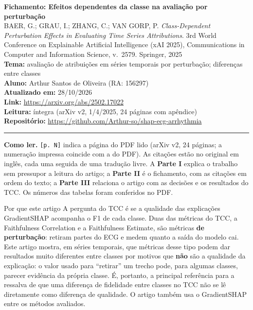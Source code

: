 \documentclass[11pt,a4paper]{article}
\begin{document}
\begin{center}
    {\LARGE \textbf{Fichamento: Efeitos dependentes da classe na avaliação por perturbação}} \\[0.35em]
    {\large BAER, G.; GRAU, I.; ZHANG, C.; VAN GORP, P. \textit{Class-Dependent Perturbation Effects in Evaluating Time Series Attributions}. 3rd World Conference on Explainable Artificial Intelligence (xAI 2025), Communications in Computer and Information Science, v.~2579. Springer, 2025} \\[0.3em]
    \textbf{Tema:} avaliação de atribuições em séries temporais por perturbação; diferenças entre classes \\[0.2em]
    \textbf{Aluno:} Arthur Santos de Oliveira (RA: 156297) \\[0.2em]
    \textbf{Atualizado em:} 28/10/2026 \\[0.2em]
    \textbf{Link:} \url{https://arxiv.org/abs/2502.17022} \\[0.2em]
    \textbf{Leitura:} íntegra (arXiv v2, 1/4/2025, 24 páginas com apêndice) \\[0.2em]
    \textbf{Repositório:} \url{https://github.com/Arthur-so/shap-ecg-arrhythmia}
\end{center}
\vspace{-0.5em}
\hrule
\vspace{0.8em}

\textbf{Como ler.} \texttt{[p. N]} indica a página do PDF lido (arXiv v2, 24 páginas; a numeração impressa coincide com a do PDF). As citações estão no original em inglês, cada uma seguida de uma tradução livre. A \textbf{Parte I} explica o trabalho sem pressupor a leitura do artigo; a \textbf{Parte II} é o fichamento, com as citações em ordem do texto; a \textbf{Parte III} relaciona o artigo com as decisões e os resultados do TCC. Os números das tabelas foram conferidos no PDF.

\begin{infobox}[note]{Por que este artigo}
A pergunta do TCC é se a qualidade das explicações GradientSHAP acompanha o F1 de cada classe. Duas das métricas do TCC, a Faithfulness Correlation e a Faithfulness Estimate, são métricas \textbf{de perturbação}: retiram partes do ECG e medem quanto a saída do modelo cai. Este artigo mostra, em séries temporais, que métricas desse tipo podem dar resultados muito diferentes entre classes por motivos que \textbf{não} são a qualidade da explicação: o valor usado para “retirar” um trecho pode, para algumas classes, parecer evidência da própria classe. É, portanto, a principal referência para a ressalva de que uma diferença de fidelidade entre classes no TCC não se lê diretamente como diferença de qualidade. O artigo também usa o GradientSHAP entre os métodos avaliados.
\end{infobox}
\end{document}

